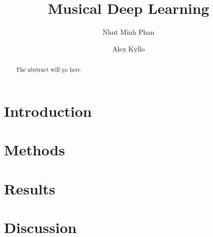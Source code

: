 \documentclass[sigconf]{acmart}
\begin{document}
\title{Musical Deep Learning}

\author{Nhut Minh Phan}

\author{Alex Kyllo}

\begin{abstract}
  The abstract will go here
\end{abstract}


\maketitle

\section{Introduction}

\cite{huang_music_2018}

\section{Methods}

\section{Results}

\section{Discussion}



\end{document}
